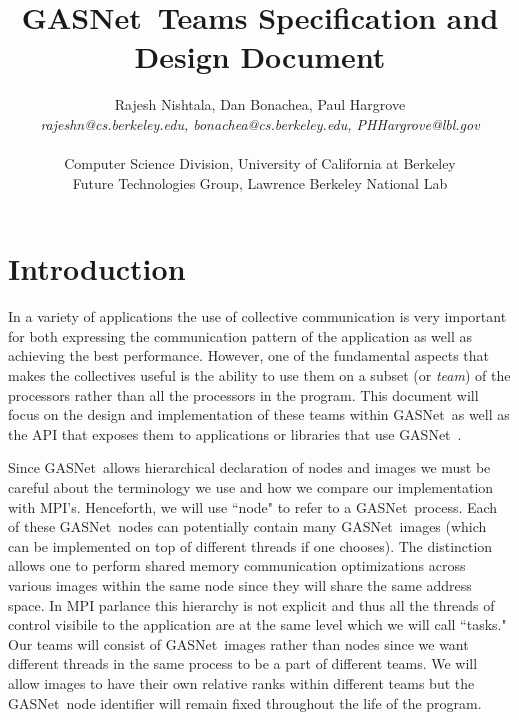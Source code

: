 \documentclass[times,10pt]{article}
\begin{document}
\newcommand{\gasnet}[0]{GASNet\ }





\title{\gasnet Teams Specification and Design Document}
\author{Rajesh Nishtala, Dan Bonachea, Paul Hargrove\\
    \emph{rajeshn@cs.berkeley.edu, bonachea@cs.berkeley.edu, PHHargrove@lbl.gov} \\\\
    Computer Science Division, University of California at Berkeley \\ 
    Future Technologies Group, Lawrence Berkeley National Lab }
\maketitle


\section{Introduction}
In a variety of applications the use of collective communication is very
important for both expressing the communication pattern of the application as
well as achieving the best performance. However, one of the fundamental aspects
that makes the collectives useful is the ability to use them on a subset (or
\textit{team}) of the processors rather than all the processors in the program.
This document will focus on the design and implementation of these teams within
\gasnet as well as the API that exposes them to applications or libraries that
use \gasnet. 

Since \gasnet allows hierarchical declaration of nodes and images we must be
careful about the terminology we use and how we compare our implementation with
MPI's. Henceforth, we will use ``node" to refer to a \gasnet process. Each of
these \gasnet nodes can potentially contain many  \gasnet images (which can be
implemented on top of different threads if one chooses). The distinction allows
one to perform shared memory communication optimizations across various images
within the same node since they will share the same address space. In MPI
parlance this hierarchy is not explicit and thus all the threads of control
visibile to the application are at the same level which we will call ``tasks."
Our teams will consist of \gasnet images rather than nodes since we want
different threads in the same process to be a part of different teams. We will
allow images to have their own relative ranks within different teams but the
\gasnet node identifier will remain fixed throughout the life of the program. 
\end{document}
